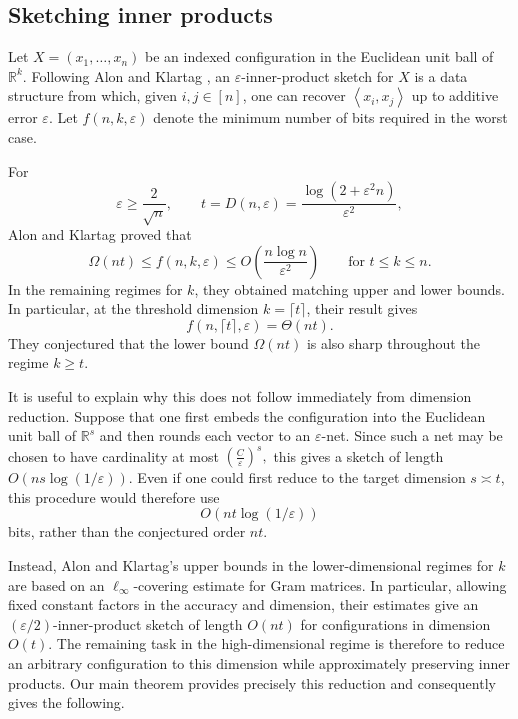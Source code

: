 \documentclass[11pt,reqno,letterpaper]{amsart}
\newcommand{\R}{\mathbb R}
\newcommand{\ip}[2]{\left\langle #1,#2\right\rangle}
\newcommand{\Dfun}[2]{D(#1,#2)}
\begin{document}
\subsection{Sketching inner products}

Let $X=(x_1,\ldots,x_n)$ be an indexed configuration in the Euclidean
unit ball of $\R^k$.  Following Alon and Klartag \cite{AK}, an
$\varepsilon$-inner-product sketch for $X$ is a data structure from which, given
$i,j\in[n]$, one can recover $\ip{x_i}{x_j}$ up to additive error $\varepsilon$.  Let
$f(n,k,\varepsilon)$ denote the minimum number of bits required in the
worst case.  

For
\[
 \varepsilon\geq {\frac{2}{\sqrt{n}}},
 \qquad
 t=\Dfun{n}{\varepsilon}
 =\frac{\log(2+\varepsilon^2n)}{\varepsilon^2},
\]
Alon and Klartag proved \cite[Theorem~2.2]{AK} that
\[
 \Omega(nt)
 \leq
 f(n,k,\varepsilon)
 \leq
 O\left(\frac{n\log n}{\varepsilon^2}\right)
 \qquad
 \text{for } t\leq k\leq n.
\]
In the remaining regimes for $k$, they obtained matching upper and lower bounds. In particular, at the threshold dimension $k= \lceil t \rceil$,
their result gives
\[
 f(n, \lceil t \rceil,\varepsilon)=\Theta(nt).
\]
They conjectured that the lower bound $\Omega(nt)$ is also sharp throughout the regime $k\geq t$.

It is useful to explain why this does not follow immediately from
dimension reduction. Suppose that one first embeds the configuration
into the Euclidean unit ball of $\R^s$ and then rounds each vector to an
$\varepsilon$-net. Since such a net may be chosen to have cardinality at
most
$
 \left(\frac{C}{\varepsilon}\right)^s,
$
this gives a sketch of length
$
 O\left(ns\log(1/\varepsilon)\right).
$
Even if one could first reduce to the target dimension $s\asymp t$, this
procedure would therefore use
\[
 O\left(nt\log(1/\varepsilon)\right)
\]
bits, rather than the conjectured order $nt$. 

Instead, Alon and Klartag's upper bounds in the lower-dimensional regimes for $k$ are
based on an $\ell_\infty$-covering estimate for Gram matrices. In particular, allowing fixed constant factors in the accuracy and
dimension, their estimates give an $(\varepsilon/2)$-inner-product
sketch of length $O(nt)$ for configurations in dimension $O(t)$.
The remaining task in the high-dimensional regime is therefore to
reduce an arbitrary configuration to this dimension while approximately
preserving inner products. Our main theorem provides precisely this
reduction and consequently gives the following.
\end{document}
